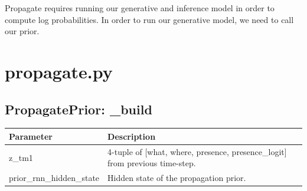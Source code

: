 \documentclass{article}
\begin{document}
Propagate requires running our generative and inference model in order to compute log probabilities. In order to run our generative model, we need to call our prior. 

\section{propagate.py}

\subsection{PropagatePrior: \_build}

\begin{center}
\begin{tabular}{ | m{10em} | m{12cm}| } 
\hline
\textbf{Parameter}& \textbf{Description} \\ 
\hline
 z\_tm1 &   4-tuple of [what, where, presence, presence\_logit] from previous time-step.\\ 
\hline
prior\_rnn\_hidden\_state & Hidden state of the propagation prior. \\
\hline
\end{tabular}
\end{center}
\end{document}
